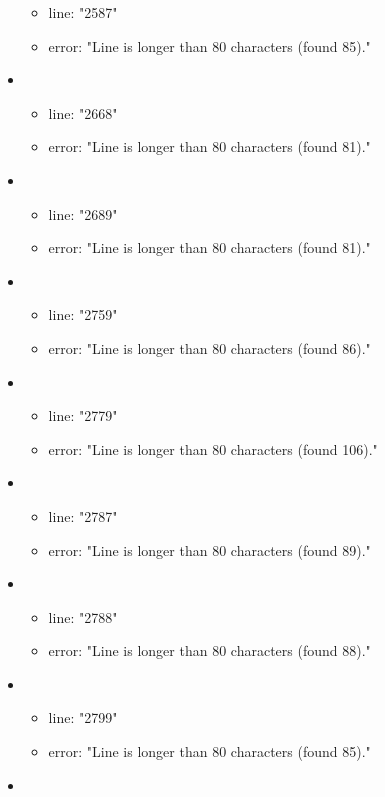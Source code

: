 \begin{itemize}
\begin{itemize}
		\item line: "2587" 
		\item error: "Line is longer than 80 characters (found 85)." 
	\end{itemize}
	\item 
	\begin{itemize} 
		\item line: "2668" 
		\item error: "Line is longer than 80 characters (found 81)." 
	\end{itemize}
	\item 
	\begin{itemize} 
		\item line: "2689" 
		\item error: "Line is longer than 80 characters (found 81)." 
	\end{itemize}
	\item 
	\begin{itemize} 
		\item line: "2759" 
		\item error: "Line is longer than 80 characters (found 86)." 
	\end{itemize}
	\item 
	\begin{itemize} 
		\item line: "2779" 
		\item error: "Line is longer than 80 characters (found 106)." 
	\end{itemize}
	\item 
	\begin{itemize} 
		\item line: "2787" 
		\item error: "Line is longer than 80 characters (found 89)." 
	\end{itemize}
	\item 
	\begin{itemize} 
		\item line: "2788" 
		\item error: "Line is longer than 80 characters (found 88)." 
	\end{itemize}
	\item 
	\begin{itemize} 
		\item line: "2799" 
		\item error: "Line is longer than 80 characters (found 85)." 
	\end{itemize}
	\item 
	\begin{itemize} 

\end{itemize}
\end{itemize}
